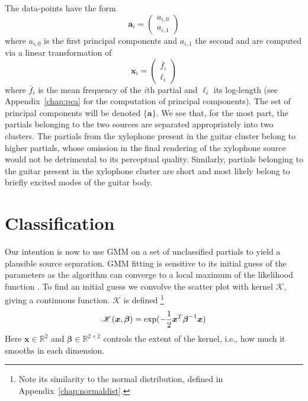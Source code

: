 The data-points have the form
\[
    \boldsymbol{a}_i = \begin{pmatrix}
        a_{i,0} \\
        a_{i,1}
    \end{pmatrix}
\]
where $a_{i,0}$ is the first principal components and $a_{i,1}$ the second and are computed via a
linear transformation of
\[
    \boldsymbol{x}_i
    =
    \begin{pmatrix}
        \overline{f}_{i} \\
        \ell_{i}
    \end{pmatrix}
\]
where $\overline{f}_{i}$ is the mean frequency of the $i$th partial and
$\ell_{i}$ its log-length (see
Appendix~\ref{chap:pca} for the computation of principal components). The set of
principal components will be denoted $\{\boldsymbol{a}\}$.
We see that, for the most part, the partials belonging to the two sources are
separated appropriately into two clusters. The partials from the xylophone
present in the guitar cluster belong to higher partials, whose omission in the
final rendering of the xylophone source would not be detrimental to its
perceptual quality. Similarly, partials belonging to the guitar present in the
xylophone cluster are short and most likely belong to briefly excited modes
of the guitar body.

\section{Classification}

Our intention is now to use GMM on a set of unclassified partials to yield a
plausible source separation. GMM fitting is sensitive to its initial guess of
the parameters as the algorithm can converge to a local maximum of the likelihood
function \cite[p.~187]{kay1993fundamentals}.  To find an initial guess we
convolve the scatter plot with kernel $\mathscr{K}$, giving a continuous function.
$\mathscr{K}$ is defined%
\footnote{Note its similarity to the normal distribution, defined in
Appendix~\ref{chap:normaldist}.}
\[
    \mathscr{K}(\boldsymbol{x},\boldsymbol{\beta})
    =
    \exp(\displaystyle-\frac{1}{2}\boldsymbol{x}^{T}\boldsymbol{\beta}^{-1}\boldsymbol{x})
\]
Here $\boldsymbol{x} \in \mathbb{R}^{2}$ and $\boldsymbol{\beta} \in
\mathbb{R}^{2 \times 2}$ controls the extent of the kernel, i.e., how much it
smooths in each dimension. 

